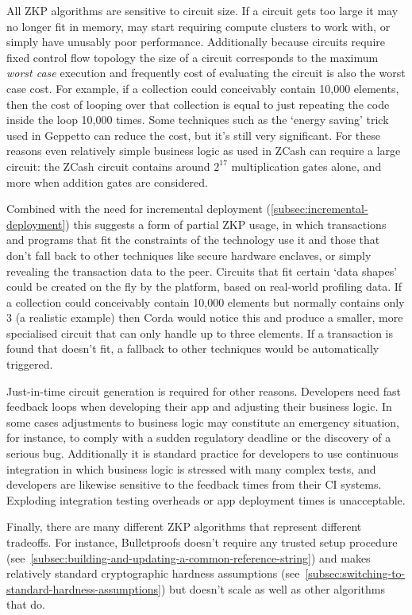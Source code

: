 \documentclass{article}
\begin{document}
All ZKP algorithms are sensitive to circuit size. If a circuit gets too large it may no longer fit in memory, may
start requiring compute clusters to work with, or simply have unusably poor performance. Additionally because
circuits require fixed control flow topology the size of a circuit corresponds to the maximum \emph{worst case}
execution and frequently cost of evaluating the circuit is also the worst case cost. For example, if a collection
could conceivably contain 10,000 elements, then the cost of looping over that collection is equal to just repeating
the code inside the loop 10,000 times. Some techniques such as the `energy saving' trick used in
Geppetto\cite{costello2015geppetto} can reduce the cost, but it's still very significant. For these reasons even
relatively simple business logic as used in ZCash can require a large circuit: the ZCash circuit contains around
$2^{17}$ multiplication gates alone, and more when addition gates are considered.

Combined with the need for incremental deployment (\cref{subsec:incremental-deployment}) this suggests a form of
partial ZKP usage, in which transactions and programs that fit the constraints of the technology use it and those
that don't fall back to other techniques like secure hardware enclaves, or simply revealing the transaction data to
the peer. Circuits that fit certain `data shapes' could be created on the fly by the platform, based on real-world
profiling data. If a collection could conceivably contain 10,000 elements but normally contains only 3 (a realistic
example) then Corda would notice this and produce a smaller, more specialised circuit that can only handle up to
three elements. If a transaction is found that doesn't fit, a fallback to other techniques would be automatically
triggered.

Just-in-time circuit generation is required for other reasons. Developers need fast
feedback loops when developing their app and adjusting their business logic. In some cases adjustments to business
logic may constitute an emergency situation, for instance, to comply with a sudden regulatory deadline or the
discovery of a serious bug. Additionally it is standard practice for developers to use continuous integration in
which business logic is stressed with many complex tests, and developers are likewise sensitive to the feedback
times from their CI systems. Exploding integration testing overheads or app deployment times is unacceptable.

Finally, there are many different ZKP algorithms that represent different tradeoffs. For instance, Bulletproofs
doesn't require any trusted setup procedure (see~\cref{subsec:building-and-updating-a-common-reference-string})
and makes relatively standard cryptographic hardness assumptions (see~\cref{subsec:switching-to-standard-hardness-assumptions})
but doesn't scale as well as other algorithms that do.
\end{document}
